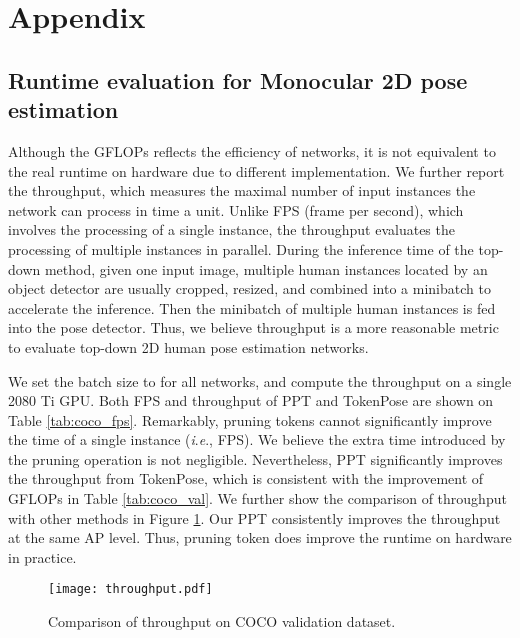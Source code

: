 \documentclass[runningheads]{llncs}
\newcommand{\ie}{\textit{i}.\textit{e}., }
\begin{document}
\section{Appendix}
\subsection{Runtime evaluation for Monocular 2D pose estimation}
Although the GFLOPs reflects the efficiency of networks, it is not equivalent to the real runtime on hardware due to different implementation. 
We further report the throughput, which measures the maximal number of input instances the network can process in time a unit. 
Unlike FPS (frame per second), which involves the processing of a single instance, the throughput evaluates the processing of multiple instances in parallel. 
During the inference time of the top-down method, given one input image, multiple human instances located by an object detector are usually cropped, resized, and combined into a minibatch to accelerate the inference. Then the minibatch of multiple human instances is fed into the pose detector. 
Thus, we believe throughput is a more reasonable metric to evaluate top-down 2D human pose estimation networks. 


We set the batch size to  for all networks, and compute the throughput on a single 2080 Ti GPU. Both FPS and throughput of PPT and TokenPose \cite{li2021tokenpose} are shown on Table \ref{tab:coco_fps}. 
Remarkably, pruning tokens cannot significantly improve the time of a single instance (\ie FPS). We believe the extra time introduced by the pruning operation is not negligible. 
Nevertheless, PPT significantly improves the throughput from TokenPose, which is consistent with the improvement of GFLOPs in Table \ref{tab:coco_val}. 
We further show the comparison of throughput with other methods in Figure \ref{fig:throughput}. Our PPT consistently improves the throughput at the same AP level. 
Thus, pruning token does improve the runtime on hardware in practice. 


\begin{table}[h]
\centering
{}
\caption{ \small{FPS and Throughput on COCO validation dataset. } }
\label{tab:coco_fps}
\end{table}







\begin{figure}[t]
    \centering
    \texttt{[image: throughput.pdf]}
    \caption{\small{Comparison of throughput on COCO validation dataset. }  }
    \label{fig:throughput}
\end{figure}
\end{document}
